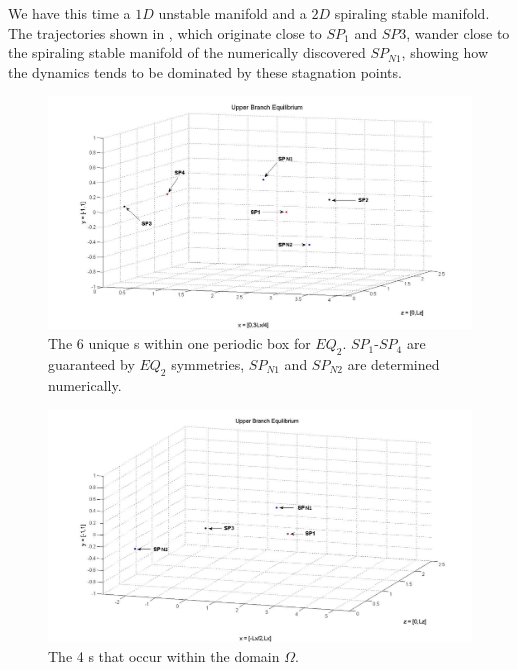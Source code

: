 \documentclass[letter,12pt,openany]{article}
\begin{document}
We have this time a $1D$ unstable manifold and a $2D$ spiraling stable
manifold. The trajectories shown in , which originate close to $SP_1$ and $SP3$, wander close to the spiraling stable manifold of the numerically discovered $SP_{N1}$, showing how the dynamics tends to be dominated by these stagnation points.

 \begin{figure}[!h]
\includegraphics[width=1.0\textwidth]{stagps_edited.jpg}
  \caption{
   The 6 unique \stagp s within one periodic box for $EQ_2$. $SP_1$-$SP_4$ are guaranteed by $EQ_2$ symmetries, $SP_{N1}$ and $SP_{N2}$ are determined numerically. 
   }
  \label{eltonFig:stagps_label}
 \end{figure}

 \begin{figure}[!h]
\includegraphics[width=1.0\textwidth]{stagps2_edited.jpg}
  \caption{
   The 4 \stagp s that occur within the domain $\Omega$.
   }
  \label{eltonFig:stagps_label2}
 \end{figure}
\end{document}

